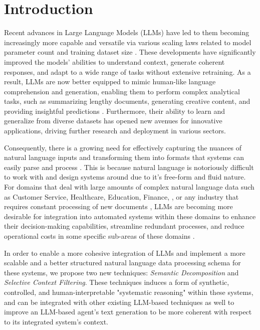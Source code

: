 \section{Introduction}

Recent advances in Large Language Models (LLMs) have led to them becoming increasingly more capable and versatile via various scaling laws related to model parameter count and training dataset size \cite{kaplanScalingLawsNeural2020, minaeeLargeLanguageModels2024}. These developments have significantly improved the models' abilities to understand context, generate coherent responses, and adapt to a wide range of tasks without extensive retraining. As a result, LLMs are now better equipped to mimic human-like language comprehension and generation, enabling them to perform complex analytical tasks, such as summarizing lengthy documents, generating creative content, and providing insightful predictions \cite{minaeeLargeLanguageModels2024}. Furthermore, their ability to learn and generalize from diverse datasets has opened new avenues for innovative applications, driving further research and deployment in various sectors.

Consequently, there is a growing need for effectively capturing the nuances of natural language inputs and transforming them into formats that systems can easily parse and process \cite{bucaioniFunctionalSoftwareReference2025}. This is because natural language is notoriously difficult to work with and design systems around due to it's free-form and fluid nature. For domains that deal with large amounts of complex natural language data such as Customer Service, Healthcare, Education, Finance, \cite{urlanaLLMsIndustrialLens2024, bommasaniOpportunitiesRisksFoundation2022}, or any industry that requires constant processing of new documents \cite{bucaioniFunctionalSoftwareReference2025}, LLMs are becoming more desirable for integration into automated systems within these domains to enhance their decision-making capabilities, streamline redundant processes, and reduce operational costs in some specific sub-areas of these domains \cite{urlanaLLMsIndustrialLens2024}.

In order to enable a more cohesive integration of LLMs and implement a more scalable and a better structured natural language data processing schema for these systems, we propose two new techniques: \textit{Semantic Decomposition} and \textit{Selective Context Filtering}. These techniques induces a form of synthetic, controlled, and human-interpretable "systematic reasoning" within these systems, and can be integrated with other existing LLM-based techniques as well to improve an LLM-based agent's text generation to be more coherent with respect to its integrated system's context.

